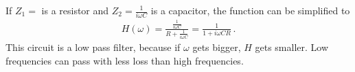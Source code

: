 \documentclass[11pt, a4paper]{article}
\begin{document}
If $Z_1 = $ is a resistor and $Z_2  = \frac{1}{i \omega C}$ is a capacitor, the function can be simplified to
\begin{align}
    H\left(\omega\right) = \frac{\frac{1}{i \omega C}}{R + \frac{1}{i \omega C}} = \frac{1}{1 + i \omega C R} \,.
\end{align}
This circuit is a low pass filter, because if $\omega$ gets bigger, $H$ gets smaller. Low frequencies can pass with less loss than high frequencies.



\end{document}
